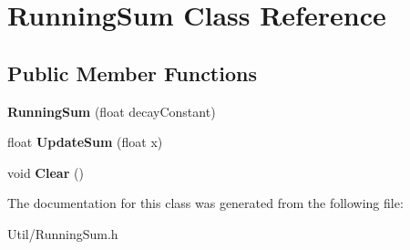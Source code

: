 \hypertarget{class_running_sum}{\section{\-Running\-Sum \-Class \-Reference}
\label{class_running_sum}
}
\subsection*{\-Public \-Member \-Functions}
\begin{DoxyCompactItemize}
\item 
\hypertarget{class_running_sum_a3ef30833e073d096a2561bad579139b3}{{\bfseries \-Running\-Sum} (float decay\-Constant)}\label{class_running_sum_a3ef30833e073d096a2561bad579139b3}

\item 
\hypertarget{class_running_sum_a2ce3ef61ad0966adc167f499bbd676a9}{float {\bfseries \-Update\-Sum} (float x)}\label{class_running_sum_a2ce3ef61ad0966adc167f499bbd676a9}

\item 
\hypertarget{class_running_sum_a6e3d39b38161f01979275007b518abb5}{void {\bfseries \-Clear} ()}\label{class_running_sum_a6e3d39b38161f01979275007b518abb5}

\end{DoxyCompactItemize}


\-The documentation for this class was generated from the following file\-:\begin{DoxyCompactItemize}
\item 
\-Util/\-Running\-Sum.\-h\end{DoxyCompactItemize}
